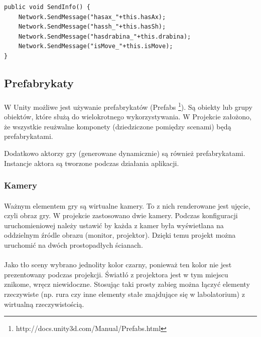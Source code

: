 \begin{lstlisting}[language=CSharp]
public void SendInfo() {
	Network.SendMessage("hasax_"+this.hasAx);
	Network.SendMessage("hassh_"+this.hasSh);
	Network.SendMessage("hasdrabina_"+this.drabina);
	Network.SendMessage("isMove_"+this.isMove);
}
\end{lstlisting}

\subsection{Prefabrykaty}
\paragraph{}
W Unity możliwe jest używanie prefabrykatów (Prefabs \footnote{http://docs.unity3d.com/Manual/Prefabs.html}). Są obiekty lub grupy obiektów, które służą do wielokrotnego wykorzystywania. W Projekcie założono, że wszystkie reużwalne komponety (dziedziczone pomiędzy scenami) będą prefabrykatami.

Dodatkowo aktorzy gry (generowane dynamicznie) są również prefabrykatami. Instancje aktora są tworzone podczas działania aplikacji.

\subsubsection{Kamery}
\paragraph{}
Ważnym elementem gry są wirtualne kamery. To z nich renderowane jest ujęcie, czyli obraz gry. W projekcie zastosowano dwie kamery. Podczas konfiguracji uruchomieniowej należy ustawić by każda z kamer była wyświetlana na oddzielnym źródle obrazu (monitor, projektor). Dzięki temu projekt można uruchomić na dwóch prostopadłych ścianach.
\paragraph{}
Jako tło sceny wybrano jednolity kolor czarny, ponieważ ten kolor nie jest prezentowany podczas projekcji. Światłó z projektora jest w tym miejscu znikome, wręcz niewidoczne. Stosując taki prosty zabieg można łączyć elementy rzeczywiste (np. rura czy inne elementy stałe znajdujące się w labolatorium) z wirtualną rzeczywistością.

